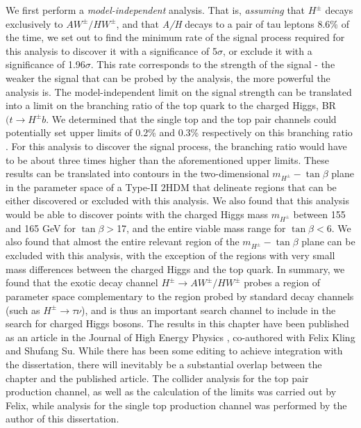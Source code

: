 We first perform a \emph{model-independent} analysis. That is, \emph{assuming} that $H^\pm$ decays exclusively to $AW^\pm/HW^\pm$, and that \emph{A/H} decays to a pair of tau leptons 8.6\% of the time, we set out to find the minimum rate of the signal process required for this analysis to discover it with a significance of 5$\sigma$, or exclude it with a significance of 1.96$\sigma$. This rate corresponds to the strength of the signal - the weaker the signal that can be probed by the analysis, the more powerful the analysis is. The model-independent limit on the signal strength can be translated into a limit on the branching ratio of the top quark to the charged Higgs, BR$(t\rightarrow H^\pm b$. We determined that the single top and the top pair channels could potentially set upper limits of 0.2\% and 0.3\% respectively on this branching ratio . For this analysis to discover the signal process, the branching ratio would have to be about three times higher than the aforementioned upper limits. These results can be translated into contours in the two-dimensional $m_{H^\pm}-\tan\beta$ plane in the parameter space of a Type-II $2$HDM that delineate regions that can be either discovered or excluded with this analysis. We also found that this analysis would be able to discover points with the charged Higgs mass $m_{H^\pm}$ between 155 and 165 GeV for $\tan\beta >$17, and the entire viable mass range for $\tan\beta <$6. We also found that almost the entire relevant region of the $m_{H^\pm}-\tan\beta$ plane can be excluded with this analysis, with the exception of the regions with very small mass differences between the charged Higgs and the top quark. In summary, we found that the exotic decay channel $H^\pm\rightarrow AW^\pm/HW^\pm$ probes a region of parameter space complementary to the region probed by standard decay channels (such as $H^\pm\rightarrow \tau\nu$), and is thus an important search channel to include in the search for charged Higgs bosons.
The results in this chapter have been published as an article in the Journal of High Energy Physics \citep{Kling2015c}, co-authored with Felix Kling and Shufang Su. While there has been some editing to achieve integration with the dissertation, there will inevitably be a substantial overlap between the chapter and the published article. The collider analysis for the top pair production channel, as well as the calculation of the limits was carried out by Felix, while analysis for the single top production channel was performed by the author of this dissertation.  

